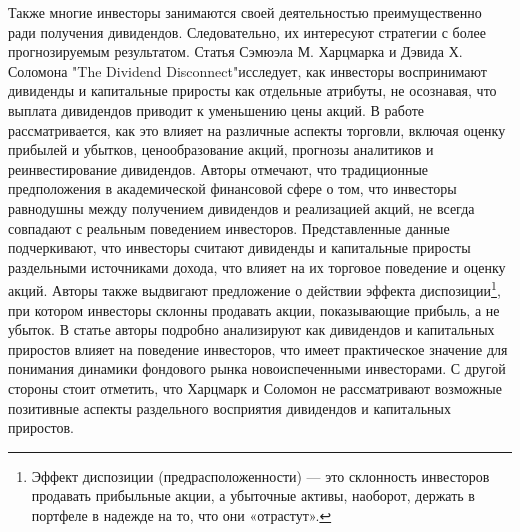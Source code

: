 \documentclass[14pt]{extarticle}
\begin{document}
Также многие инвесторы занимаются своей деятельностью преимущественно ради получения дивидендов. Следовательно, их интересуют стратегии с более прогнозируемым результатом. Статья Сэмюэла М. Харцмарка и Дэвида Х. Соломона "The Dividend Disconnect"\cite{2fef20e6-54c7-3c5b-8792-6382b832ccff}исследует, как инвесторы воспринимают дивиденды и капитальные приросты как отдельные атрибуты, не осознавая, что выплата дивидендов приводит к уменьшению цены акций. В работе рассматривается, как это влияет на различные аспекты торговли, включая оценку прибылей и убытков, ценообразование акций, прогнозы аналитиков и реинвестирование дивидендов. Авторы отмечают, что традиционные предположения в академической финансовой сфере о том, что инвесторы равнодушны между получением дивидендов и реализацией акций, не всегда совпадают с реальным поведением инвесторов. Представленные данные подчеркивают, что инвесторы считают дивиденды и капитальные приросты раздельными источниками дохода, что влияет на их торговое поведение и оценку акций. Авторы также выдвигают предложение о действии эффекта диспозиции\footnote{Эффект диспозиции (предрасположенности) — это склонность инвесторов продавать прибыльные акции, а убыточные активы, наоборот, держать в портфеле в надежде на то, что они «отрастут».}, при котором инвесторы склонны продавать акции, показывающие прибыль, а не убыток.
В статье авторы подробно анализируют как дивидендов и капитальных приростов влияет на поведение инвесторов, что имеет практическое значение для понимания динамики фондового рынка новоиспеченными инвесторами. С другой стороны стоит отметить, что Харцмарк и Соломон не рассматривают возможные позитивные аспекты раздельного восприятия дивидендов и капитальных приростов.
\end{document}
